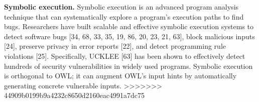 \noindent
\textbf{Symbolic execution.} Symbolic execution is an advanced program
analysis technique that can systematically explore a program’s
execution paths to find bugs. Researchers have built
scalable and effective symbolic execution systems to detect
software bugs [34, 68, 33, 35, 19, 86, 20, 23, 21, 63], block
malicious inputs [24], preserve privacy in error reports [22],
and detect programming rule violations [25]. Specifically,
UCKLEE [63] has been shown to effectively detect hundreds
of security vulnerabilities in widely used programs. Symbolic
execution is orthogonal to OWL; it can augment OWL’s input
hints by automatically generating concrete vulnerable inputs.
>>>>>>> 44909b0199b9a4232c8650d2160eac4991a7dc75
